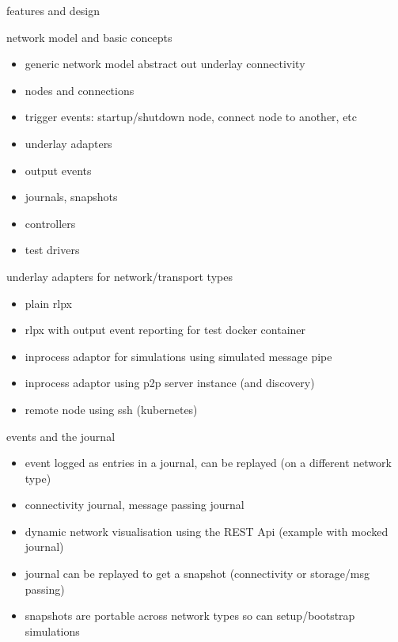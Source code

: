 \documentclass{beamer}
\begin{document}
\begin{section}{features and design}

\begin{frame}{}
\begin{block}{network model and basic concepts}
 \begin{itemize}
    \item generic network model abstract out underlay connectivity
    \item nodes and connections
    \item trigger events: startup/shutdown node, connect node to another, etc
    \item underlay adapters
    \item output events
    \item journals, snapshots
    \item controllers
    \item test drivers
\end{itemize}
\end{block}
\end{frame}

\begin{frame}{}
\begin{block}{underlay adapters for network/transport types}
 \begin{itemize}
    \item plain rlpx
    \item rlpx with output event reporting for test docker container
    \item inprocess adaptor for simulations using simulated message pipe
    \item inprocess adaptor using p2p server instance (and discovery)
    \item remote node using ssh (kubernetes)
\end{itemize}
\end{block}
\end{frame}


\begin{frame}{}
\begin{block}{events and the journal}
 \begin{itemize}

\item  event logged as entries in a journal, can be replayed (on a different network type)
\item  connectivity journal, message passing journal
\item  dynamic network visualisation using the REST Api (example with mocked journal)
\item  journal can be replayed to get a snapshot (connectivity or storage/msg passing)
\item  snapshots are portable across network types so can setup/bootstrap simulations
\end{itemize}
\end{block}
\end{frame}



\end{section}
\end{document}
